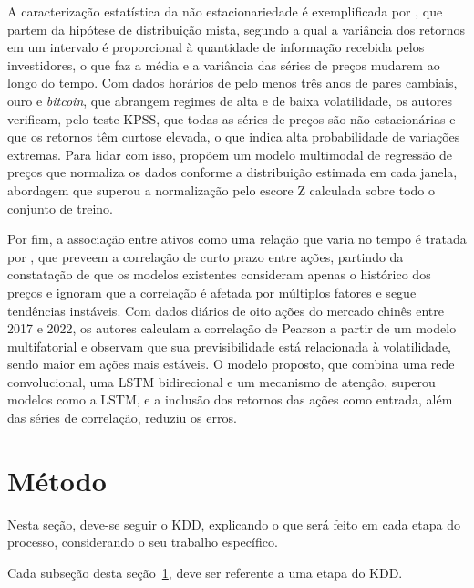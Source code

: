 \documentclass[12pt,a4paper]{article}
\begin{document}
\begin{sloppypar}
A caracterização estatística da não estacionariedade é exemplificada por \textcite{anbaee_farimani_adaptive_2024}, que partem da hipótese de distribuição mista, segundo a qual a variância dos retornos em um intervalo é proporcional à quantidade de informação recebida pelos investidores, o que faz a média e a variância das séries de preços mudarem ao longo do tempo. Com dados horários de pelo menos três anos de pares cambiais, ouro e \textit{bitcoin}, que abrangem regimes de alta e de baixa volatilidade, os autores verificam, pelo teste KPSS, que todas as séries de preços são não estacionárias e que os retornos têm curtose elevada, o que indica alta probabilidade de variações extremas. Para lidar com isso, propõem um modelo multimodal de regressão de preços que normaliza os dados conforme a distribuição estimada em cada janela, abordagem que superou a normalização pelo escore Z calculada sobre todo o conjunto de treino.
\end{sloppypar}

Por fim, a associação entre ativos como uma relação que varia no tempo é tratada por \textcite{luo_short-term_2024}, que preveem a correlação de curto prazo entre ações, partindo da constatação de que os modelos existentes consideram apenas o histórico dos preços e ignoram que a correlação é afetada por múltiplos fatores e segue tendências instáveis. Com dados diários de oito ações do mercado chinês entre 2017 e 2022, os autores calculam a correlação de Pearson a partir de um modelo multifatorial e observam que sua previsibilidade está relacionada à volatilidade, sendo maior em ações mais estáveis. O modelo proposto, que combina uma rede convolucional, uma LSTM bidirecional e um mecanismo de atenção, superou modelos como a LSTM, e a inclusão dos retornos das ações como entrada, além das séries de correlação, reduziu os erros.

\section{Método}\label{sec:metodo}

Nesta seção, deve-se seguir o KDD, explicando o que será feito em cada etapa do
processo, considerando o seu trabalho específico.

Cada subseção desta seção~\ref{sec:metodo}, deve ser referente a uma etapa do
KDD.
\end{document}
